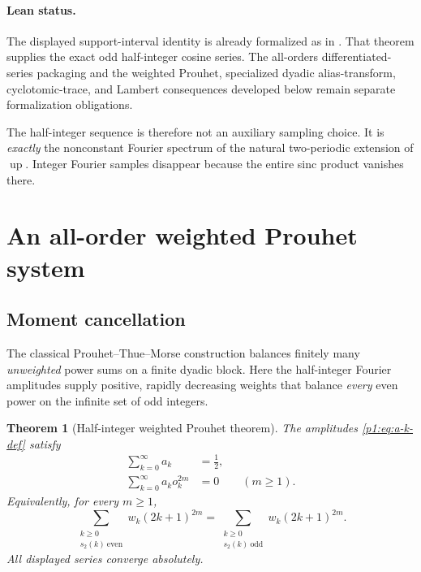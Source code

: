 \documentclass[11pt,oneside]{article}
\newtheorem{theorem}{Theorem}[section]
\theoremstyle{definition}
\theoremstyle{remark}
\newcommand{\Up}{\operatorname{up}}
\begin{document}
\paragraph{Lean status.}
The displayed support-interval identity is already formalized as
 in
.  That theorem supplies the exact odd
half-integer cosine series.  The all-orders differentiated-series packaging
and the weighted Prouhet, specialized dyadic alias-transform, cyclotomic-trace, and Lambert
consequences developed below remain separate formalization obligations.

\begin{remark}
The half-integer sequence is therefore not an auxiliary sampling choice.  It is
\emph{exactly} the nonconstant Fourier spectrum of the natural two-periodic
extension of $\Up$.  Integer Fourier samples disappear because the entire sinc
product vanishes there.
\end{remark}

\section{An all-order weighted Prouhet system}\label{p1:sec:prouhet}

\subsection{Moment cancellation}

The classical Prouhet--Thue--Morse construction balances finitely many
\emph{unweighted} power sums on a finite dyadic block.  Here the half-integer
Fourier amplitudes supply positive, rapidly decreasing weights that balance
\emph{every} even power on the infinite set of odd integers.

\begin{theorem}[Half-integer weighted Prouhet theorem]\label{p1:thm:weighted-prouhet}
The amplitudes \eqref{p1:eq:a-k-def} satisfy
\begin{align}
 \sum_{k=0}^{\infty}a_k&=\frac12,
 \label{p1:eq:mass-half}\\
 \sum_{k=0}^{\infty}a_k o_k^{2m}&=0
 \qquad(m\ge1).
 \label{p1:eq:all-even-moments-zero}
\end{align}
Equivalently, for every $m\ge1$,
\begin{equation}\label{p1:eq:positive-prouhet}
 \boxed{
 \sum_{\substack{k\ge0\\s_2(k)\ \mathrm{even}}}
 w_k(2k+1)^{2m}
 =
 \sum_{\substack{k\ge0\\s_2(k)\ \mathrm{odd}}}
 w_k(2k+1)^{2m}.}
\end{equation}
All displayed series converge absolutely.
\end{theorem}
\end{document}
